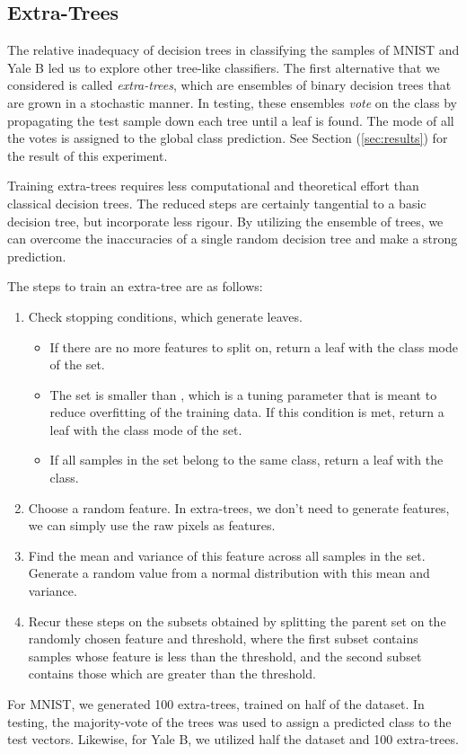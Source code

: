 \pagebreak
\subsection{Extra-Trees}

The relative inadequacy of decision trees in classifying the samples of MNIST and Yale B led us to explore other tree-like classifiers. The first alternative that we considered is called \emph{extra-trees}, which are ensembles of binary decision trees that are grown in a stochastic manner. In testing, these ensembles \emph{vote} on the class by propagating the test sample down each tree until a leaf is found. The mode of all the votes is assigned to the global class prediction. See Section (\ref{sec:results}) for the result of this experiment. 

Training extra-trees requires less computational and theoretical effort than classical decision trees. The reduced steps are certainly tangential to a basic decision tree, but incorporate less rigour. By utilizing the ensemble of trees, we can overcome the inaccuracies of a single random decision tree and make a strong prediction. 

The steps to train an extra-tree are as follows:
%
\begin{enumerate}
\item Check stopping conditions, which generate leaves.
%
  \begin{itemize}
  \item If there are no more features to split on, return a leaf with the class mode of the set. 
  \item The set is smaller than , which is a tuning parameter that is meant to reduce overfitting of the training data. If this condition is met, return a leaf with the class mode of the set.
  \item If all samples in the set belong to the same class, return a leaf with the class.
  \end{itemize}
\item Choose a random feature. In extra-trees, we don't need to generate features, we can simply use the raw pixels as features. 
\item Find the mean and variance of this feature across all samples in the set. Generate a random value from a normal distribution with this mean and variance. 
\item Recur these steps on the subsets obtained by splitting the parent set on the randomly chosen feature and threshold, where the first subset contains samples whose feature is less than the threshold, and the second subset contains those which are greater than the threshold.
\end{enumerate}

For MNIST, we generated 100 extra-trees, trained on half of the dataset. In testing, the majority-vote of the trees was used to assign a predicted class to the test vectors. Likewise, for Yale B, we utilized half the dataset and 100 extra-trees.
